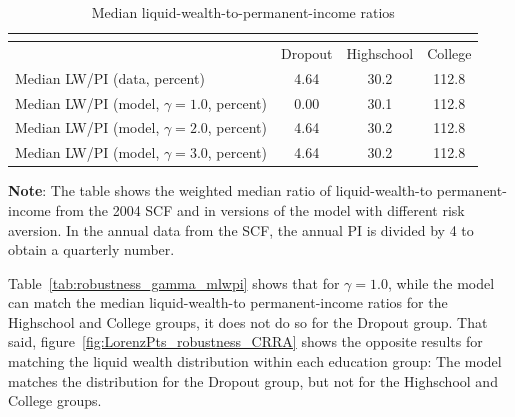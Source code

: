 \documentclass[\econtexRoot/HAFiscal]{subfiles}
\begin{document}
\begin{table}[th]
  \begin{center}
    \begin{tabular}{lccc}
      \multicolumn{4}{l}{} \\ \midrule
      & Dropout & Highschool & College \\ \midrule
      Median LW/PI (data, percent) & 4.64 & 30.2 & 112.8 \\ 
      Median LW/PI (model, $\gamma = 1.0$, percent) & 0.00 & 30.1 & 112.8 \\	
      Median LW/PI (model, $\gamma = 2.0$, percent) & 4.64 & 30.2 & 112.8 \\
      Median LW/PI (model, $\gamma = 3.0$, percent) & 4.64 & 30.2 & 112.8 \\ \bottomrule
    \end{tabular}
    \caption{Median liquid-wealth-to-permanent-income ratios}
    \notinsubfile{\label{tab:robustness_gamma_mlwpi}}	
    \parbox{15cm}{\small \vspace{.05cm} \textbf{Note}: The table shows the weighted median ratio of liquid-wealth-to permanent-income from the 2004 SCF and in versions of the model with different risk aversion. In the annual data from the SCF, the annual PI is divided by 4 to obtain a quarterly number.\normalsize}
  \end{center}
\end{table}

Table~\ref{tab:robustness_gamma_mlwpi} shows that for $\gamma=1.0$, while the model can match the median liquid-wealth-to permanent-income ratios for the Highschool and College groups, it does not do so for the Dropout group. That said, figure~\ref{fig:LorenzPts_robustness_CRRA} shows the opposite results for matching the liquid wealth distribution within each education group: The model matches the distribution for the Dropout group, but not for the Highschool and College groups. 
\end{document}
